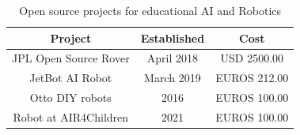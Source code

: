 \documentclass[sigconf]{acmart}
\begin{document}






\begin{table}
  \begin{tabular}{ccc}
    \toprule
    Project & Established  & Cost\\
    \midrule
    JPL Open Source Rover \cite{OSR:2018} & April 2018  &  USD 2500.00 \\
    JetBot AI Robot \cite{nanoJetBot:2019} & March 2019  & EUROS 212.00    \\
    Otto DIY robots \cite{OttoDIY:2016} & 2016 &  EUROS 100.00  \\
    Robot at AIR4Children & 2021 & EUROS 100.00  \\
  \bottomrule
\end{tabular}
\caption{Open source projects for educational AI and Robotics}
\label{tab:opensourceprojects}
\end{table}
\end{document}
